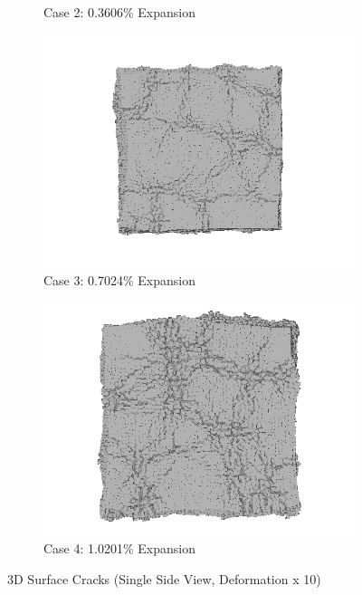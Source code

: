 \begin{figure}[!h]
\begin{subfigure}{.5\textwidth}
    \caption{Case 2: 0.3606\% Expansion}
    \end{subfigure}%
    \begin{subfigure}{.5\textwidth}
      \centering
      \includegraphics[width=.9\linewidth]{Files/exp_3D/ASR/A30P25_3_3ds.png}
    \caption{Case 3: 0.7024\% Expansion}
    \end{subfigure}
    \begin{subfigure}{.5\textwidth}
      \centering
      \includegraphics[width=.8\linewidth]{Files/exp_3D/ASR/A30P25_4_3ds.png}
    \caption{Case 4: 1.0201\% Expansion}
    \end{subfigure}%

  \caption{3D Surface Cracks (Single Side View, Deformation x 10)}
  \label{fig:ASR_A30P25_3DS}
\end{figure}

